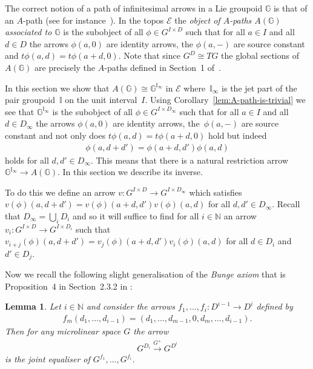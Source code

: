 \documentclass[pdftex]{sigma}
\numberwithin{equation}{section}
\newtheorem{Lemma}[Theorem]{Lemma}
\begin{document}
The correct notion of a path of inf\/initesimal arrows in a Lie groupoid $\mathbb{G}$ is that of an $A$-path (see for instance~\cite{MR1973056}). In the topos $\mathcal{E}$ the \emph{object of $A$-paths $A(\mathbb{G})$ associated to $\mathbb{G}$} is the subobject of all $\phi\in G^{I\times D}$ such that for all $a\in I$ and all $d\in D$ the arrows $\phi(a,0)$ are identity arrows, the $\phi(a,-)$ are source constant and $t\phi(a,d)=t\phi(a+d,0)$. Note that since $G^D\cong TG$ the global sections of~$A(\mathbb{G})$ are precisely the $A$-paths def\/ined in Section~1 of~\cite{MR1973056}.

In this section we show that $A(\mathbb{G})\cong \mathbb{G}^{\mathbb{I}_{\infty}}$ in $\mathcal{E}$ where~$\mathbb{I}_{\infty}$ is the jet part of the pair groupoid~$\mathbb{I}$ on the unit interval~$I$. Using Corollary~\ref{lem:A-path-is-trivial} we see that $\mathbb{G}^{\mathbb{I}_{\infty}}$ is the subobject of all $\phi\in G^{I\times D_{\infty}}$ such that for all $a\in I$ and all $d\in D_{\infty}$ the arrows $\phi(a,0)$ are identity arrows, the~$\phi(a,-)$ are source constant and not only does $t\phi(a,d)=t\phi(a+d,0)$ hold but indeed
\begin{gather*}\phi(a,d+d')=\phi(a+d,d')\phi(a,d)\end{gather*}
holds for all $d,d'\in D_{\infty}$. This means that there is a natural restriction arrow $\mathbb{G}^{\mathbb{I}_{\infty}} \rightarrow A(\mathbb{G})$. In this section we describe its inverse.

To do this we def\/ine an arrow $v\colon G^{I\times D} \rightarrow G^{I\times D_{\infty}}$ which satisf\/ies $v(\phi)(a,d+d')=v(\phi)(a+d,d')v(\phi)(a,d)$ for all $d,d'\in D_{\infty}$. Recall that $D_{\infty}=\bigcup_i D_i$ and so it will suf\/f\/ice to f\/ind for all $i\in\mathbb{N}$ an arrow $v_i\colon G^{I\times D} \rightarrow G^{I\times D_i}$ such that $v_{i+j}(\phi)(a,d+d')=v_j(\phi)(a+d,d')v_i(\phi)(a,d)$ for all $d\in D_i$ and $d'\in D_j$.

Now we recall the following slight generalisation of the \emph{Bunge axiom} that is Proposition~4 in Section~2.3.2 in \cite{MR1385464}:

\begin{Lemma}\label{lem:bunge-axiom}
Let $i\in \mathbb{N}$ and consider the arrows $f_{1},\dots ,f_{i}\colon D^{i-1}\rightarrow D^{i}$ defined by
\begin{gather*}f_{m}(d_{1},\dots ,d_{i-1})=(d_{1},\dots ,d_{m-1},0,d_{m},\dots ,d_{i-1}).\end{gather*}
Then for any microlinear space $G$ the arrow
\begin{gather*}G^{D_{i}}\xrightarrow{G^{+}}G^{D^{i}}\end{gather*}
is the joint equaliser of $G^{f_{1}},\dots,G^{f_{i}}$.
\end{Lemma}
\end{document}
